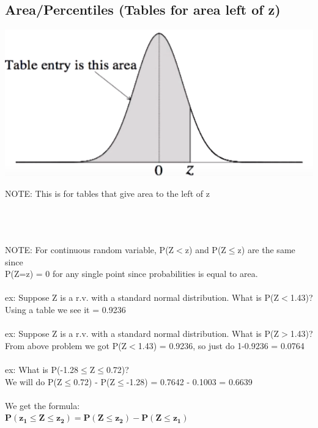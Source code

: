 \documentclass[12pt, a4paper]{article}
\begin{document}
	\subsection{Area/Percentiles (Tables for area left of z)}
	\begin{minipage}[c]{8.5cm}
		\includegraphics[scale=.45]{leftz} \\
	\end{minipage}
	\begin{minipage}[c]{6cm}
		NOTE: This is for tables that give area to the left of z \\~\\
	\end{minipage} \\~\\
	NOTE: For continuous random variable, P(Z$<$z) and P(Z$\leq$z) are the same since \\ P(Z=z) = 0 for any single point since probabilities is equal to area. \\~\\
	ex: Suppose Z is a r.v. with a standard normal distribution. What is P(Z$<$1.43)? \\
	Using a table we see it = 0.9236 \\~\\
	ex: Suppose Z is a r.v. with a standard normal distribution. What is P(Z$>$1.43)? \\
	From above problem we got P(Z$<$1.43) = 0.9236, so just do 1-0.9236 = 0.0764 \\~\\
	ex: What is P(-1.28$\leq$Z$\leq$0.72)? \\
	We will do P(Z$\leq$0.72) - P(Z$\leq$-1.28) = 0.7642 - 0.1003 = 0.6639 \\~\\
	We get the formula: \\
	$\mathbf{P(z_1\leq Z \leq z_2) = P(Z\leq z_2) - P(Z\leq z_1)}$ \\~\\
\end{document}
